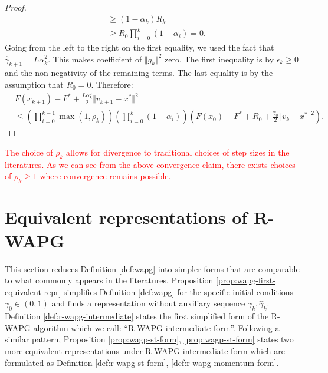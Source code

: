\documentclass[12pt]{article}
\begin{document}
\begin{proof}
\begin{align*}
            &\ge 
            (1 - \alpha_k) R_k
            \\
            &\ge R_0 \prod_{i = 0}^{k} \left(1 - \alpha_i\right) = 0. 
        \end{align*}
        Going from the left to the right on the first equality, we used the fact that $\hat \gamma_{k + 1} = L \alpha_{k}^2$.
        This makes coefficient of $\Vert g_k\Vert^2$ zero. 
        The first inequality is by $\epsilon_k \ge 0$ and the non-negativity of the remaining terms. 
        The last equality is by the assumption that $R_0 = 0$. 
        Therefore: 
        {\small
        \begin{align*}
            & F(x_{k + 1}) - F^* +
            \frac{L\alpha_k^2}{2}\Vert v_{k + 1} - x^*\Vert^2
            \\
            &\le 
            \left(
                \prod_{i = 0}^{k - 1} \max(1, \rho_{k})
            \right)
            \left(
                \prod_{i = 0}^{k} \left(1  - \alpha_i\right)
            \right)
            \left(
                F(x_0) - F^* + R_0 + \frac{\gamma_0}{2}\Vert v_k - x^*\Vert^2
            \right). 
        \end{align*}
        }
    \end{proof}
    \begin{remark}        
        \textcolor{red}
        {
            The choice of $\rho_k$ allows for divergence to traditional choices of step sizes in the literatures. 
            As we can see from the above convergence claim, there exists choices of $\rho_k\ge 1$ where convergence remains possible. 
        }
    \end{remark}


\section{Equivalent representations of R-WAPG}
    This section reduces Definition \ref{def:wapg} into simpler forms that are comparable to what commonly appears in the literatures. 
    Proposition \ref{prop:wapg-first-equivalent-repr} simplifies Definition \ref{def:wapg} for the specific initial conditions $\gamma_0 \in(0, 1)$ and finds a representation without auxiliary sequence $\gamma_k, \hat \gamma_k$. 
    Definition \ref{def:r-wapg-intermediate} states the first simplified form of the R-WAPG algorithm which we call: ``R-WAPG intermediate form''. 
    Following a similar pattern, Proposition \ref{prop:wagp-st-form}, \ref{prop:wagp-st-form} states two more equivalent representations under R-WAPG intermediate form which are formulated as Definition \ref{def:r-wapg-st-form}, \ref{def:r-wapg-momentum-form}. 
    
\end{document}
